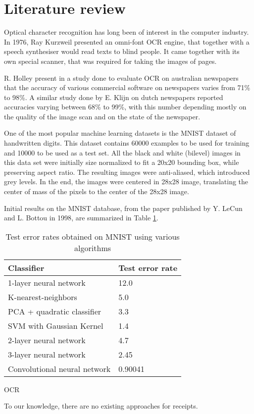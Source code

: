 \section{Literature review}
Optical character recognition has long been of interest in the computer industry. In 1976, Ray Kurzweil presented an omni-font OCR engine, that together with a speech synthesiser would read texts to blind people. It came together with its own special scanner, that was required for taking the images of pages. \cite{schantz1982history}

R. Holley present in a study\cite{Holley_2009} done to evaluate OCR on australian newspapers that the accuracy of various commercial software on newspapers varies from 71\% to 98\%. A similar study done by E. Klijn on dutch newspapers reported accuracies varying between 68\% to 99\%, with this number depending mostly on the quality of the image scan and on the state of the newspaper. 

One of the most popular machine learning datasets is the MNIST dataset of handwritten digits\cite{lecun1998mnist}. This dataset contains 60000 examples to be used for training and 10000 to be used as a test set. All the black and white (bilevel) images in this data set were initially size normalized to fit a 20x20 bounding box, while preserving aspect ratio. The resulting images were anti-aliased, which introduced grey levels. In the end, the images were centered in 28x28 image, translating the center of mass of the pixels to the center of the 28x28 image. 

Initial results on the MNIST database, from the paper published by Y. LeCun and L. Bottou in 1998\cite{Lecun_1998}, are summarized in Table \ref{table:mnist_results}. 

\begin{table}[h]
\caption{Test error rates obtained on MNIST using various algorithms}
\label{table:mnist_results}
\begin{tabular}{ll}
\hline
Classifier                   & Test error rate \\ \hline
1-layer neural network       & 12.0            \\
K-nearest-neighbors          & 5.0             \\
PCA + quadratic classifier   & 3.3             \\
SVM with Gaussian Kernel     & 1.4             \\
2-layer neural network       & 4.7             \\
3-layer neural network       & 2.45            \\
Convolutional neural network & 0.90041         \\ \hline
\end{tabular}
\end{table}
OCR 

To our knowledge, there are no existing approaches for receipts.